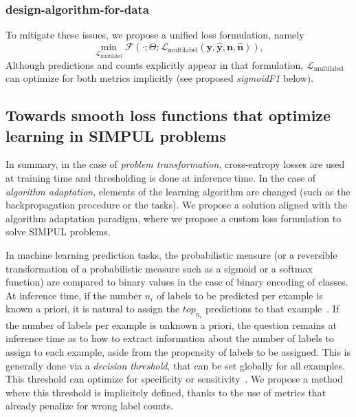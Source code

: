 \subsubsection{design-algorithm-for-data}

To mitigate these issues, we propose a unified loss formulation,
namely
%
\begin{equation}
\underset{\mathcal{L}_{\text {multilabel}}} {\min} \mathcal{F}\left(\cdot ;
\Theta; \mathcal{L}_{\text {multilabel}} (\mathbf{y}, \hat{\mathbf{y}},
\mathbf{n}, \hat{\mathbf{n}}) \right),
\end{equation}
%
Although predictions and counts explicitly appear in that formulation,
\(\mathcal{L}_{\text {multilabel}}\) can optimize for both metrics implicitly
(see proposed \emph{sigmoidF1} below).


\subsection{Towards smooth loss functions that optimize learning
in SIMPUL problems}
In summary, in the case of \emph{problem transformation},
cross-entropy losses are used at training time and thresholding is done at
inference time. In the case of \emph{algorithm adaptation}, elements of the
learning algorithm are changed (such as the backpropagation procedure or the
tasks). We propose a solution aligned with the algorithm adaptation paradigm,
where we propose a custom loss formulation to solve SIMPUL problems.

In machine learning prediction tasks, the probabilistic measure (or a reversible
transformation of a probabilistic measure such as a sigmoid or a softmax
function) are compared to binary values in the case of binary encoding of
classes. At inference time, if the number $n_i$ of labels to be predicted per
example is known a priori, it is natural to assign the $top_{n_i}$ predictions
to that example~\cite{lossTopKError, topKmulticlassSVM}. If the number of
labels per example is unknown a priori, the question remains at inference time
as to how to extract information about the number of labels to assign to each
example, aside from the propensity of labels to be assigned. This is generally
done via a \emph{decision threshold}, that can be set globally for all
examples. This threshold can optimize for specificity or
sensitivity~\cite{decisionThreshold}. We propose a method where this threshold
is implicitely defined, thanks to the use of metrics that already penalize for
wrong label counts.

